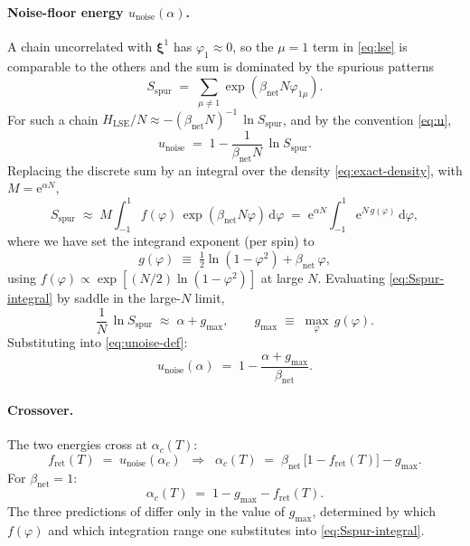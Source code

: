 \documentclass[11pt]{article}
\newcommand{\bxi}{\boldsymbol{\xi}}
\newcommand{\e}{{\mathrm{e}}}
\newcommand{\dd}{{\mathrm{d}}}
\newcommand{\Bnet}{\beta_{\mathrm{net}}}
\newcommand{\fret}{f_{\mathrm{ret}}}
\begin{document}
\paragraph{Noise-floor energy $u_{\mathrm{noise}}(\alpha)$.}
A chain uncorrelated with $\bxi^1$ has $\varphi_1 \approx 0$, so the
$\mu = 1$ term in \eqref{eq:lse} is comparable to the others and the
sum is dominated by the spurious patterns
\begin{equation}
S_{\mathrm{spur}}
   \;=\; \sum_{\mu \neq 1} \exp(\Bnet N \varphi_{1\mu}).
\label{eq:Sspur}
\end{equation}
For such a chain
$H_{\mathrm{LSE}}/N \approx -(\Bnet N)^{-1}\,\ln S_{\mathrm{spur}}$,
and by the convention \eqref{eq:u},
\begin{equation}
u_{\mathrm{noise}} \;=\; 1 - \frac{1}{\Bnet N}\,\ln S_{\mathrm{spur}}.
\label{eq:unoise-def}
\end{equation}
Replacing the discrete sum by an integral over the density
\eqref{eq:exact-density}, with $M = \e^{\alpha N}$,
\begin{equation}
S_{\mathrm{spur}}
   \;\approx\;
   M \int_{-1}^{1} f(\varphi)\,\exp(\Bnet N \varphi)\,\dd\varphi
   \;=\; \e^{\alpha N}
        \int_{-1}^{1} \e^{N\,g(\varphi)}\,\dd\varphi,
\label{eq:Sspur-integral}
\end{equation}
where we have set the integrand exponent (per spin) to
\begin{equation}
g(\varphi) \;\equiv\;
   \tfrac12 \ln(1 - \varphi^2) + \Bnet\,\varphi,
\label{eq:g}
\end{equation}
using $f(\varphi) \propto \exp[(N/2)\ln(1-\varphi^2)]$ at large $N$.
Evaluating \eqref{eq:Sspur-integral} by saddle in the large-$N$ limit,
\begin{equation}
\frac{1}{N}\,\ln S_{\mathrm{spur}}
   \;\approx\; \alpha + g_{\max},
\qquad
g_{\max} \;\equiv\; \max_{\varphi}\, g(\varphi).
\label{eq:lnSspur}
\end{equation}
Substituting into \eqref{eq:unoise-def}:
\begin{equation}
\boxed{\;
u_{\mathrm{noise}}(\alpha)
   \;=\; 1 - \frac{\alpha + g_{\max}}{\Bnet}.
\;}
\label{eq:unoise}
\end{equation}

\paragraph{Crossover.}
The two energies cross at $\alpha_c(T)$:
\begin{equation}
\fret(T) \;=\; u_{\mathrm{noise}}(\alpha_c)
\;\;\Longrightarrow\;\;
\alpha_c(T) \;=\; \Bnet\,\bigl[1 - \fret(T)\bigr] - g_{\max}.
\label{eq:master}
\end{equation}
For $\Bnet = 1$:
\begin{equation}
\boxed{\;
\alpha_c(T) \;=\; 1 - g_{\max} - \fret(T).
\;}
\label{eq:master-1}
\end{equation}
The three predictions of  differ only in the value
of $g_{\max}$, determined by which $f(\varphi)$ and which integration
range one substitutes into \eqref{eq:Sspur-integral}.
\end{document}
